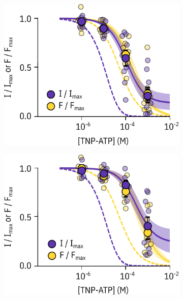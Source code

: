 \begin{figure}[h]
\begin{subfigure}[t]{0.45\textwidth}
	\end{subfigure}
	\vfill
	\begin{subfigure}[t]{0.45\textwidth}
		\caption{}\label{ch6fig:mwc_k205_1}
		\centering
		\includegraphics[width=\textwidth]{mwc_k205_1.pdf}
	\end{subfigure}
	\hfill
	\begin{subfigure}[t]{0.45\textwidth}
		\caption{}\label{ch6fig:mwc_k205_2}
		\centering
		\includegraphics[width=\textwidth]{mwc_k205_2.pdf}
	\end{subfigure}
	\vfill
	\begin{subfigure}[t]{0.45\textwidth}

\end{subfigure}
\end{figure}
